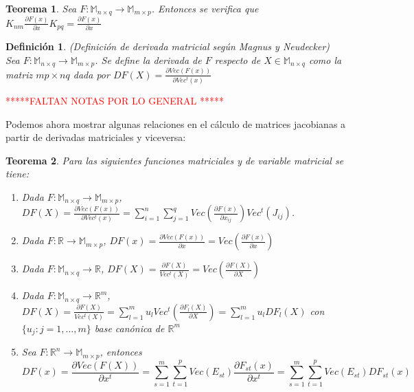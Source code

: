 \documentclass{article}
\theoremstyle{theorem-style}  %
\newtheorem{theorem}{Teorema}[section]  %
\theoremstyle{definition-style}
\newtheorem{definition}{Definición}[section]
\theoremstyle{example-style}
\theoremstyle{exercise-style}
\begin{document}
	\begin{theorem}
		\textit{Sea $F:\mathbb{M}_{n\times q}\rightarrow \mathbb{M}_{m\times p}$. Entonces se verifica que $K_{nm}\frac{\partial F(x)}{\partial x}K_{pq}= \frac{\partial F(x)}{\partial x}$}
	\end{theorem}
	
	\begin{definition}
		(Definición de derivada matricial según Magnus y Neudecker)\\
		Sea $F:\mathbb{M}_{n\times q}\rightarrow \mathbb{M}_{m\times p}$. Se define la derivada de $F$ respecto de $X\in \mathbb{M}_{n\times q}$ como la matriz $mp\times nq$ dada por \textbf{$DF(X)=\frac{\partial Vec(F(x))}{\partial Vec^t(x)}$}
	\end{definition}
	
	\textcolor{red}{*****FALTAN NOTAS POR LO GENERAL *****}
	
	Podemos ahora mostrar algunas relaciones en el cálculo de matrices jacobianas a partir de derivadas matriciales y viceversa:
	
	
	\begin{theorem}
		Para las siguientes funciones matriciales y de variable matricial se tiene:
		
		\begin{enumerate}
			\item Dada $F:\mathbb{M}_{n\times q} \rightarrow \mathbb{M}_{m \times p}$, $DF(X)=\frac{\partial Vec(F(x))}{\partial Vec^t(x)}=\sum_{i=1}^{n} \sum_{j=1}^{q} Vec(\frac{\partial F(x)}{\partial x_{ij}})Vec^t(J_{ij})$.
			
			\item Dada $F:\mathbb{R} \rightarrow \mathbb{M}_{m \times p}$, $DF(x)=\frac{\partial Vec(F(x))}{\partial x} = Vec(\frac{\partial F(x)}{\partial x})$ 
			
			\item Dada $F:\mathbb{M}_{n\times q} \rightarrow \mathbb{R}$, $DF(X)=\frac{\partial F(X)}{Vec^t(X)}=Vec(\frac{\partial F(X)}{\partial X})$
			
			\item  Dada $F:\mathbb{M}_{n\times q} \rightarrow \mathbb{R}^m$, $DF(X)=\frac{\partial F(X)}{Vec^t(X)} = \sum_{l=1}^{m} u_l Vec^t(\frac{\partial F_l(X)}{\partial X})=\sum_{l=1}^{m} u_l DF_l(X)$ con $\{u_j: j=1, \dots, m\}$ base canónica de $\mathbb{R}^m$
			
			\item Sea $F: \mathbb{R}^n \rightarrow \mathbb{M}_{m\times p} $, entonces 
			$$ DF(x)= \frac{\partial Vec(F(X))}{\partial x^t} = \sum_{s=1}^{m} \sum_{t=1}^{p} Vec(E_{st}) \frac{\partial F_{st}(x)}{\partial x^t} = \sum_{s=1}^{m} \sum_{t=1}^{p} Vec(E_{st}) DF_{st}(x)$$
			
			
		\end{enumerate}
	\end{theorem}
	
\end{document}
